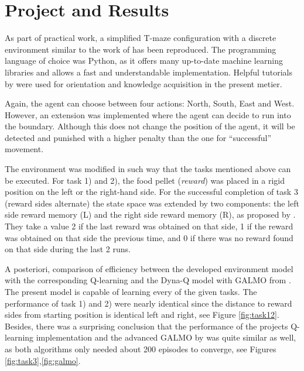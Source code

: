 \documentclass[a4paper]{article}
\begin{document}
	\section{Project and Results}
	\label{sec:project}
	As part of practical work, a simplified T-maze configuration with a discrete environment similar to the work of \cite{NeuralDynaQ} has been reproduced. The programming language of choice was Python, as it offers many up-to-date machine learning libraries and allows a fast and understandable implementation. Helpful tutorials by \citet{harrison.2019} were used for orientation and knowledge acquisition in the present metier. 
	\par Again, the agent can choose between four actions: North, South, East and West. However, an extension was implemented where the agent can decide to run into the boundary. Although this does not change the position of the agent, it will be detected and punished with a higher penalty than the one for ``successful'' movement.\\
	\par The environment was modified in such way that the tasks mentioned above can be executed. For task 1) and 2), the food pellet (\textit{reward}) was placed in a rigid position on the left or the right-hand side.  For the successful completion of task 3 (reward sides alternate) the state space was extended by two components: the left side reward memory (L) and the right side reward memory (R), as proposed by \citet{NeuralDynaQ}. They take a value 2 if the last reward was obtained on that side, 1 if the reward was obtained on that side the previous time, and 0 if there was no reward found on that side during the last 2 runs. \\
	\par A posteriori, comparison of efficiency between the developed environment model with the corresponding Q-learning and the Dyna-Q model with GALMO from \citet{NeuralDynaQ}. The present model is capable of learning every of the given tasks. The performance of task 1) and 2) were nearly identical since the distance to reward sides from starting position is identical left and right, see Figure \ref{fig:task12}. \\
	Besides, there was a surprising conclusion that the performance of the projects Q-learning implementation and the advanced GALMO by was quite similar as well, as both algorithms only needed about 200 episodes to converge, see Figures \ref{fig:task3},\ref{fig:galmo}.  
\end{document}
